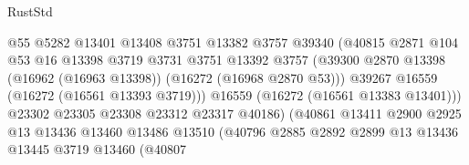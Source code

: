 \begin{lexlean}{RustStd}
\begin{coremodule}
                                        @55
                                        @5282
                                        @13401
                                        @13408
                                        @3751
                                        @13382
                                        @3757
                                        @39340
                                        (@40815
                                          @2871
                                          @104
                                          @53
                                          @16
                                          @13398
                                          @3719
                                          @3731
                                          @3751
                                          @13392
                                          @3757
                                          (@39300
                                            @2870
                                            @13398
                                            (@16962 (@16963 @13398))
                                            (@16272 (@16968 @2870 @53)))
                                          @39267
                                          @16559
                                          (@16272 (@16561 @13393 @3719)))
                                        @16559
                                        (@16272 (@16561 @13383 @13401)))
                                      @23302
                                      @23305
                                      @23308
                                      @23312
                                      @23317
                                      @40186)
                                    (@40861
                                      @13411
                                      @2900
                                      @2925
                                      @13
                                      @13436
                                      @13460
                                      @13486
                                      @13510
                                      (@40796
                                        @2885
                                        @2892
                                        @2899
                                        @13
                                        @13436
                                        @13445
                                        @3719
                                        @13460
                                        (@40807

\end{coremodule}
\end{lexlean}
